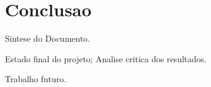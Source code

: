 \chapter*{Conclusao}
\label{concl}

Sintese do Documento.

Estado final do projeto; Analise critica dos resultados.

Trabalho futuro.

